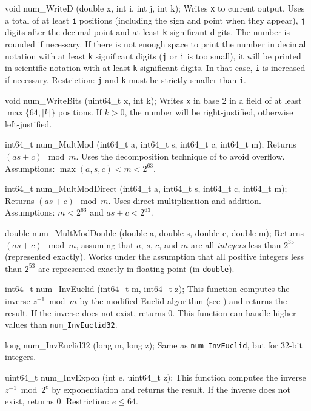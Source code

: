 {void num_WriteD (double x, int i, int j, int k);
\endcode
  \tab  Writes {\tt x} to current output.  Uses a total of at least {\tt i}
   positions (including the sign and point when they appear),
   {\tt j} digits after the decimal point and at least {\tt k}
   significant digits.   The number is rounded if necessary.
   If there is not enough space to print the number in decimal notation
   with at least {\tt k} significant digits
   ({\tt j} or {\tt i} is too small), it will be printed in scientific
   notation with at least {\tt k} significant digits.
   In that case, {\tt i} is increased if necessary.
   Restriction: {\tt j} and {\tt k} must be strictly smaller than {\tt i}.
 \endtab
\code

void num_WriteBits (uint64_t x, int k);
\endcode
 \tab Writes {\tt x} in base 2 in a field of at least $\max\{64, |k|\}$ positions.
  If $k>0$, the number will be right-justified, otherwise left-justified.
 \endtab
\code

int64_t num_MultMod (int64_t a, int64_t s, int64_t c, int64_t m);
\endcode
\tab  Returns $(as + c) \mod m$.  Uses the decomposition technique
  of \cite{rLEC91a} to avoid overflow.
	Assumptions: $\max(a,s,c) < m < 2^{63}$.
\endtab
\code

int64_t num_MultModDirect (int64_t a, int64_t s, int64_t c, int64_t m);
\endcode
\tab  Returns $(as + c) \mod m$.  Uses direct multiplication and addition.
  Assumptions: $m < 2^{63}$ and $as+c < 2^{63}$.
\endtab
\code

double num_MultModDouble (double a, double s, double c, double m);
\endcode
 \tab  Returns $(as+c) \mod m$, assuming that
  $a$, $s$, $c$, and $m$ are all {\em integers\/} less than $2^{35}$
  (represented exactly).
  Works under the assumption that all positive integers less than
  $2^{53}$ are represented exactly in floating-point (in {\tt double}).
\endtab
\code

int64_t num_InvEuclid (int64_t m, int64_t z);
\endcode
 \tab  This function computes the inverse $z^{-1}\bmod m$ by the
  modified Euclid algorithm (see \cite[p. 325]{iKNU81a}) and returns
  the result. If the inverse does not exist, returns 0. This function
  can handle higher values than {\tt num\_InvEuclid32}.
\endtab
\code

long num_InvEuclid32 (long m, long z);
\endcode
 \tab  Same as \texttt{num\_InvEuclid}, but for 32-bit integers.
\endtab
\code

uint64_t num_InvExpon (int e, uint64_t z);
\endcode
 \tab
  This function computes the inverse  $z^{-1} \bmod 2^e$
  by exponentiation  and returns the result. If the inverse does not  exist, returns 0.
  Restriction: $e \le 64$.
 \endtab
\code

}
